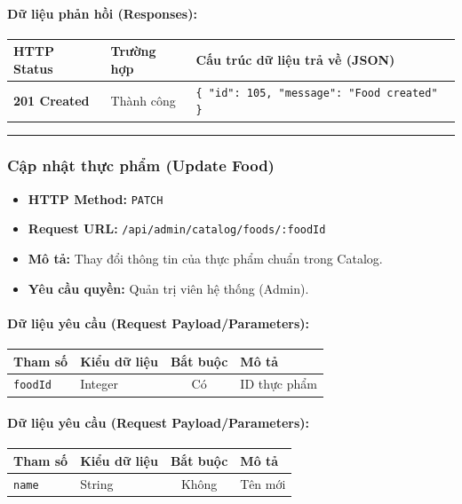 \documentclass[12pt,a4paper]{article}
\begin{document}
\paragraph{Dữ liệu phản hồi (Responses):}
\begin{longtable}{|p{2.8cm}|p{3.2cm}|p{8.0cm}|}
\hline
\textbf{HTTP Status} & \textbf{Trường hợp} & \textbf{Cấu trúc dữ liệu trả về (JSON)} \\ \hline
\endhead
\textbf{201 Created} & Thành công & \texttt{\{ "id": 105, "message": "Food created" \}} \\ \hline
\end{longtable}

\vskip 0.4cm
\noindent\rule{\textwidth}{0.3pt}
\vskip 0.4cm

\subsubsection{Cập nhật thực phẩm (Update Food)}
\begin{itemize}[leftmargin=*]
    \item \textbf{HTTP Method:} \texttt{PATCH}
    \item \textbf{Request URL:} \texttt{/api/admin/catalog/foods/:foodId}
    \item \textbf{Mô tả:} Thay đổi thông tin của thực phẩm chuẩn trong Catalog.
    \item \textbf{Yêu cầu quyền:} Quản trị viên hệ thống (Admin).
\end{itemize}

\paragraph{Dữ liệu yêu cầu (Request Payload/Parameters):}
\begin{longtable}{|p{2.8cm}|p{2.2cm}|c|p{7.0cm}|}
\hline
\textbf{Tham số} & \textbf{Kiểu dữ liệu} & \textbf{Bắt buộc} & \textbf{Mô tả} \\ \hline
\endhead
\texttt{foodId} & Integer & Có & ID thực phẩm \\ \hline
\end{longtable}

\paragraph{Dữ liệu yêu cầu (Request Payload/Parameters):}
\begin{longtable}{|p{2.8cm}|p{2.2cm}|c|p{7.0cm}|}
\hline
\textbf{Tham số} & \textbf{Kiểu dữ liệu} & \textbf{Bắt buộc} & \textbf{Mô tả} \\ \hline
\endhead
\texttt{name} & String & Không & Tên mới \\ \hline
\end{longtable}
\end{document}
